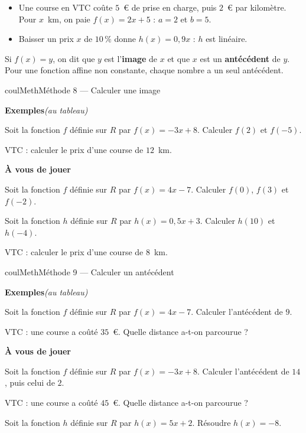 \documentclass[11pt,a4paper]{article}
\makeatletter
\newcommand{\R}{\mathbb{R}}
\newcommand{\N}{\mathbb{N}}
\newcommand{\Z}{\mathbb{Z}}
\newcommand{\Q}{\mathbb{Q}}
\newcommand{\vect}[1]{\overrightarrow{#1}}
\newcommand{\fois}[1]{\times{\color{coulExo}#1}}
\providecommand{\Cf}{\mathcal{C}\sb{f}}%
\providecommand{\Cg}{\mathcal{C}\sb{g}}%
\newcounter{lycee@signet}
\newcommand{\signet}[3][]{\stepcounter{lycee@signet}%
  \edef\lycee@dest{\if\relax\detokenize{#1}\relax
    signet.\arabic{lycee@signet}\else#1\fi}%
  \hypertarget{\lycee@dest}{}\bookmark[level=#2,dest=\lycee@dest]{#3}}
\def\R{R}\def\N{N}\def\Z{Z}\def\Q{Q}\def\vect#1{#1}\def\Cf{Cf}\def\Cg{Cg}\def\fois#1{×#1}%
\newcounter{methode}
\newenvironment{methodebox}[1][Méthode]{\stepcounter{methode}%
  \begin{boitecours}[phantom={\signet[methode-\arabic{methode}]{2}{#1}}]{coulMeth}{#1}}%
  {\end{boitecours}}
\newcommand{\etape}[1]{\par\smallskip\textbf{\color{coulMeth}#1}\par\nobreak\smallskip}
\newcommand{\autableau}{\hfill{\footnotesize\itshape\color{black!45}(au tableau)}}
\newcommand{\etapeexemples}{%
    \par\smallskip\textbf{\color{coulMeth}Exemples}\autableau\par\nobreak\smallskip}
\makeatother
\begin{document}
\begin{exemplebox}[Exemples]
\begin{itemize}
  \item Une course en VTC coûte $5$~€ de prise en charge, puis $2$~€ par kilomètre.
        Pour $x$~km, on paie $f(x)=2x+5$ : $a=2$ et $b=5$.
  \item Baisser un prix $x$ de $10\,\%$ donne $h(x)=0{,}9x$ : $h$ est linéaire.
\end{itemize}
\end{exemplebox}

\begin{remarquebox}
Si $f(x)=y$, on dit que $y$ est l'\textbf{image} de $x$ et que $x$ est un
\textbf{antécédent} de $y$. Pour une fonction affine non constante, chaque nombre a
un seul antécédent.
\end{remarquebox}

\begin{methodebox}[Méthode 8 --- Calculer une image]
\etapeexemples
\begin{questions}[label=\alph*)]
  \item Soit la fonction $f$ définie sur $\R$ par $f(x)=-3x+8$. Calculer $f(2)$ et $f(-5)$.
  \item VTC : calculer le prix d'une course de $12$~km.
\end{questions}

\etape{À vous de jouer}
\begin{questions}
  \item Soit la fonction $f$ définie sur $\R$ par $f(x)=4x-7$. Calculer $f(0)$, $f(3)$ et $f(-2)$.
  \item Soit la fonction $h$ définie sur $\R$ par $h(x)=0{,}5x+3$. Calculer $h(10)$ et $h(-4)$.
  \item VTC : calculer le prix d'une course de $8$~km.
\end{questions}

\end{methodebox}

\begin{methodebox}[Méthode 9 --- Calculer un antécédent]
\etapeexemples
\begin{questions}[label=\alph*)]
  \item Soit la fonction $f$ définie sur $\R$ par $f(x)=4x-7$. Calculer l'antécédent de $9$.
  \item VTC : une course a coûté $35$~€. Quelle distance a-t-on parcourue ?
\end{questions}

\etape{À vous de jouer}
\begin{questions}
  \item Soit la fonction $f$ définie sur $\R$ par $f(x)=-3x+8$. Calculer l'antécédent de $14$, puis celui de $2$.
  \item VTC : une course a coûté $45$~€. Quelle distance a-t-on parcourue ?
  \item Soit la fonction $h$ définie sur $\R$ par $h(x)=5x+2$. Résoudre $h(x)=-8$.
\end{questions}

\end{methodebox}
\end{document}
